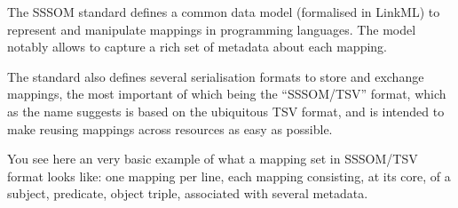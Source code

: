 \begin{frame}
{  The SSSOM standard defines a common data model (formalised in LinkML) to
  represent and manipulate mappings in programming languages. The model
  notably allows to capture a rich set of metadata about each mapping.

  The standard also defines several serialisation formats to store and
  exchange mappings, the most important of which being the ``SSSOM/TSV''
  format, which as the name suggests is based on the ubiquitous TSV format,
  and is intended to make reusing mappings across resources as easy as
  possible.

  You see here an very basic example of what a mapping set in SSSOM/TSV format
  looks like: one mapping per line, each mapping consisting, at its core, of a
  subject, predicate, object triple, associated with several metadata.}

\end{frame}

